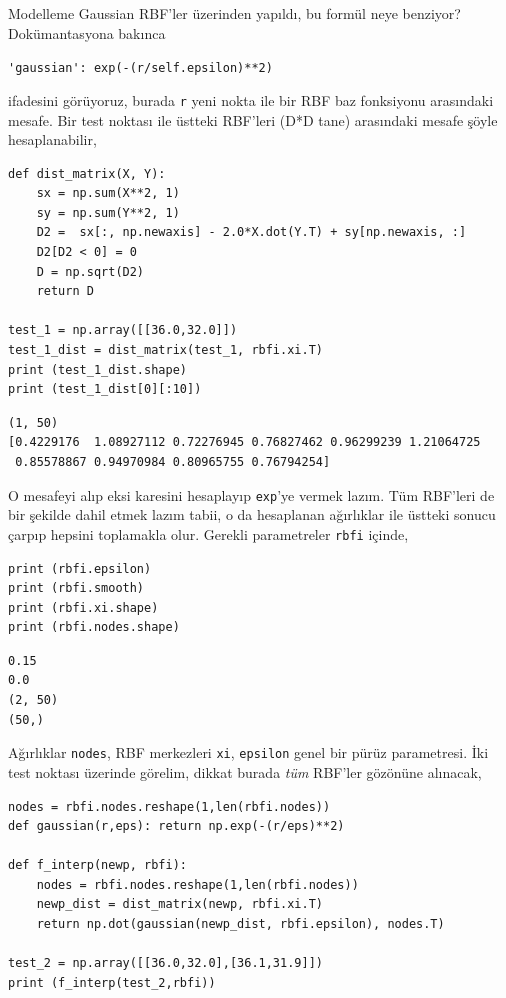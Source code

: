 \documentclass[12pt,fleqn]{article}\usepackage{../../common}
\begin{document}
Modelleme Gaussian RBF'ler üzerinden yapıldı, bu formül neye benziyor?
Dokümantasyona bakınca 

\verb!'gaussian': exp(-(r/self.epsilon)**2)!

ifadesini görüyoruz, burada \verb!r! yeni nokta ile bir RBF baz fonksiyonu
arasındaki mesafe. Bir test noktası ile üstteki RBF'leri (D*D tane)
arasındaki mesafe şöyle hesaplanabilir,

\begin{verbatim}
def dist_matrix(X, Y):
    sx = np.sum(X**2, 1)
    sy = np.sum(Y**2, 1)
    D2 =  sx[:, np.newaxis] - 2.0*X.dot(Y.T) + sy[np.newaxis, :] 
    D2[D2 < 0] = 0
    D = np.sqrt(D2)
    return D
    
test_1 = np.array([[36.0,32.0]])
test_1_dist = dist_matrix(test_1, rbfi.xi.T)
print (test_1_dist.shape)
print (test_1_dist[0][:10])
\end{verbatim}

\begin{verbatim}
(1, 50)
[0.4229176  1.08927112 0.72276945 0.76827462 0.96299239 1.21064725
 0.85578867 0.94970984 0.80965755 0.76794254]
\end{verbatim}

O mesafeyi alıp eksi karesini hesaplayıp \verb!exp!'ye vermek lazım. Tüm
RBF'leri de bir şekilde dahil etmek lazım tabii, o da hesaplanan ağırlıklar
ile üstteki sonucu çarpıp hepsini toplamakla olur. Gerekli parametreler
\verb!rbfi! içinde,

\begin{verbatim}
print (rbfi.epsilon)
print (rbfi.smooth)
print (rbfi.xi.shape)
print (rbfi.nodes.shape)
\end{verbatim}

\begin{verbatim}
0.15
0.0
(2, 50)
(50,)
\end{verbatim}

Ağırlıklar \verb!nodes!, RBF merkezleri \verb!xi!, \verb!epsilon! genel bir
pürüz parametresi. İki test noktası üzerinde görelim, dikkat burada {\em
  tüm} RBF'ler gözönüne alınacak,

\begin{verbatim}
nodes = rbfi.nodes.reshape(1,len(rbfi.nodes))
def gaussian(r,eps): return np.exp(-(r/eps)**2)

def f_interp(newp, rbfi):
    nodes = rbfi.nodes.reshape(1,len(rbfi.nodes))
    newp_dist = dist_matrix(newp, rbfi.xi.T)
    return np.dot(gaussian(newp_dist, rbfi.epsilon), nodes.T)

test_2 = np.array([[36.0,32.0],[36.1,31.9]])
print (f_interp(test_2,rbfi))
\end{verbatim}
\end{document}
